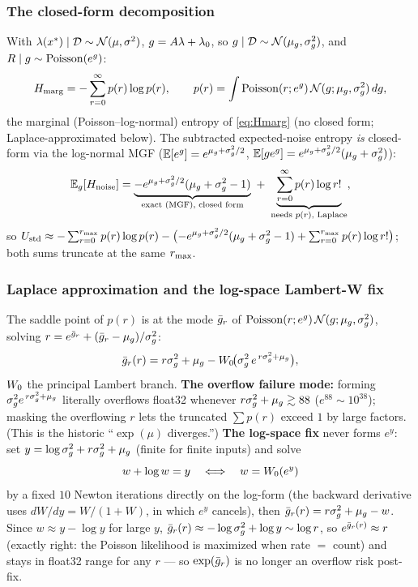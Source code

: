 \subsubsection{The closed-form decomposition}
With $\lambda(x^*)\mid\mathcal{D}\sim\mathcal{N}(\mu,\sigma^{2})$, $g=A\lambda+\lambda_{0}$, so
$g\mid\mathcal{D}\sim\mathcal{N}(\mu_{g},\sigma_{g}^{2})$, and $R\mid g\sim\mathrm{Poisson}(e^{g})$:
\[
  H_{\mathrm{marg}}=-\sum_{r=0}^{\infty}p(r)\log p(r),\qquad p(r)=\int\mathrm{Poisson}(r;e^{g})\,\mathcal{N}(g;\mu_{g},\sigma_{g}^{2})\,dg,
\]
the marginal (Poisson--log-normal) entropy of \eqref{eq:Hmarg} (no closed form;
Laplace-approximated below). The subtracted expected-noise entropy \emph{is}
closed-form via the log-normal MGF ($\mathbb{E}[e^{g}]=e^{\mu_{g}+\sigma_{g}^{2}/2}$,
$\mathbb{E}[g e^{g}]=e^{\mu_{g}+\sigma_{g}^{2}/2}(\mu_{g}+\sigma_{g}^{2})$):
\begin{equation}\label{eq:Ehnoise}
  \mathbb{E}_{g}[H_{\mathrm{noise}}]=\underbrace{-e^{\mu_{g}+\sigma_{g}^{2}/2}(\mu_{g}+\sigma_{g}^{2}-1)}_{\text{exact (MGF), closed form}}\ +\ \underbrace{\sum_{r=0}^{\infty}p(r)\log r!}_{\text{needs }p(r)\text{, Laplace}} ,
\end{equation}
so $U_{\mathrm{std}}\approx-\sum_{r=0}^{r_{\max}}p(r)\log p(r)-\bigl(-e^{\mu_{g}+\sigma_{g}^{2}/2}(\mu_{g}+\sigma_{g}^{2}-1)+\sum_{r=0}^{r_{\max}}p(r)\log r!\bigr)$;
both sums truncate at the same $r_{\max}$.

\subsubsection{Laplace approximation and the log-space Lambert-W fix}
The saddle point of $p(r)$ is at the mode $\bar{g}_{r}$ of
$\mathrm{Poisson}(r;e^{g})\,\mathcal{N}(g;\mu_{g},\sigma_{g}^{2})$, solving $r=e^{\bar{g}_{r}}+(\bar{g}_{r}-\mu_{g})/\sigma_{g}^{2}$:
\begin{equation}\label{eq:lambertmode}
  \bar{g}_{r}(r)=r\sigma_{g}^{2}+\mu_{g}-W_{0}\!\bigl(\sigma_{g}^{2}\,e^{\,r\sigma_{g}^{2}+\mu_{g}}\bigr),
\end{equation}
$W_{0}$ the principal Lambert branch. \textbf{The overflow failure mode:} forming
$\sigma_{g}^{2} e^{\,r\sigma_{g}^{2}+\mu_{g}}$ literally overflows float32 whenever
$r\sigma_{g}^{2}+\mu_{g}\gtrsim88$ ($e^{88}\sim10^{38}$); masking the overflowing $r$ lets the
truncated $\sum p(r)$ exceed $1$ by large factors. (This is the historic
``$\exp(\mu)$ diverges.'') \textbf{The log-space fix} never forms $e^y$:
set $y=\log\sigma_{g}^{2}+r\sigma_{g}^{2}+\mu_{g}$ (finite for finite inputs) and solve
\[
  w+\log w=y\quad\Longleftrightarrow\quad w=W_{0}(e^y)
\]
by a fixed $10$ Newton iterations directly on the log-form (the backward
derivative uses $dW/dy=W/(1+W)$, in which $e^y$ cancels), then
$\bar{g}_{r}(r)=r\sigma_{g}^{2}+\mu_{g}-w$. Since $w\approx y-\log y$ for large $y$,
$\bar{g}_{r}(r)\approx-\log\sigma_{g}^{2}+\log y\sim\log r$, so $e^{\bar{g}_{r}(r)}\approx r$ (exactly
right: the Poisson likelihood is maximized when rate $=$ count) and stays in
float32 range for any $r$ --- so $\exp(\bar{g}_{r})$ is no longer an overflow risk
post-fix.

